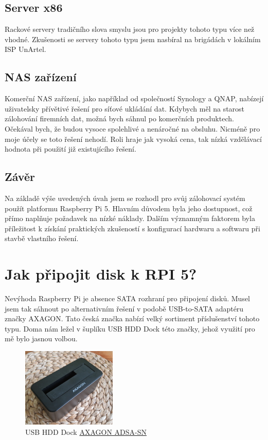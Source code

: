 \documentclass[a4paper,12pt, oneside]{book}
\begin{document}
\subsection{Server x86}

Rackové servery tradičního slova smyslu jsou pro projekty tohoto typu
více než vhodné. Zkušenosti se servery tohoto typu
jsem nasbíral na brigádách v lokálním ISP UnArtel. 

\subsection{NAS zařízení}

Komerční NAS zařízení, jako například od společností Synology a QNAP, nabízejí
uživatelsky přívětivé řešení pro síťové ukládání dat. Kdybych 
měl na starost zálohování firemních dat, možná bych sáhnul po komerčních
produktech. Očekával bych, že budou vysoce spolehlivé a nenáročné na obsluhu.
Nicméně pro moje účely se toto řešení nehodí. Roli hraje jak vysoká cena,
tak nízká vzdělávací hodnota při použití již existujícího řešení.

\subsection{Závěr}



Na základě výše uvedených úvah jsem se rozhodl pro svůj zálohovací systém použít
platformu Raspberry Pi 5. Hlavním důvodem byla jeho dostupnost, což přímo
naplňuje požadavek na nízké náklady. Dalším významným faktorem byla příležitost
k získání praktických zkušeností s konfigurací hardwaru a softwaru při stavbě
vlastního řešení.


\section{Jak připojit disk k RPI 5?}

Nevýhoda Raspberry Pi je absence SATA rozhraní pro připojení disků.
Musel jsem tak sáhnout po alternativním řešení v podobě 
USB-to-SATA adaptéru značky AXAGON. Tato česká značka nabízí 
velký sortiment příslušenství tohoto typu. Doma nám ležel v šuplíku
USB HDD Dock této značky, jehož využití pro mě 
bylo jasnou volbou.

\begin{figure}[h]
	\centering
	\includegraphics[width=0.4\textwidth]{img/axagon.jpg}
	\caption{USB HDD Dock \href{https://www.axagon.eu/produkty/adsa-sn}{AXAGON ADSA-SN}}
\end{figure}
\end{document}
